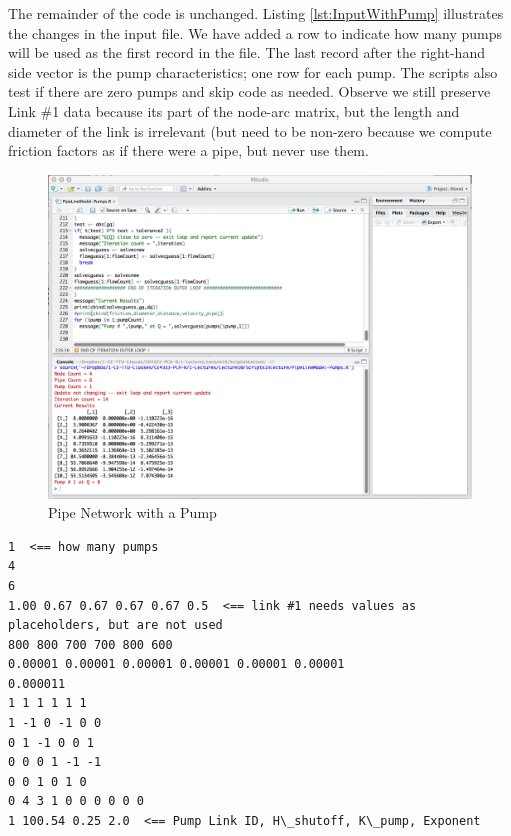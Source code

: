The remainder of the code is unchanged.
Listing \ref{lst:InputWithPump} illustrates the changes in the input file.
We have added a row to indicate how many pumps will be used as the first record in the file.
The last record after the right-hand side vector is the pump characteristics; one row for each pump.
The scripts also test if there are zero pumps and skip code as needed.
Observe we still preserve Link \#1 data because its part of the node-arc matrix, but the length and diameter of the link is irrelevant (but need to be non-zero because we compute friction factors as if there were a pipe, but never use them.

\begin{figure}[h!] %
   \centering
   \includegraphics[width=6in]{./10-PumpsAndValves/PipeNetPumpInR.jpg} 
   \caption{Pipe Network with a Pump}
   \label{fig:PipeNetPumpInR}
\end{figure}

\begin{lstlisting}[caption=Input file with pumps at link\#1 in a pipeline network \\ , label=lst:InputWithPump]
1  <== how many pumps
4
6
1.00 0.67 0.67 0.67 0.67 0.5  <== link #1 needs values as placeholders, but are not used
800 800 700 700 800 600
0.00001 0.00001 0.00001 0.00001 0.00001 0.00001
0.000011
1 1 1 1 1 1
1 -1 0 -1 0 0
0 1 -1 0 0 1
0 0 0 1 -1 -1
0 0 1 0 1 0
0 4 3 1 0 0 0 0 0 0
1 100.54 0.25 2.0  <== Pump Link ID, H\_shutoff, K\_pump, Exponent
\end{lstlisting}   

